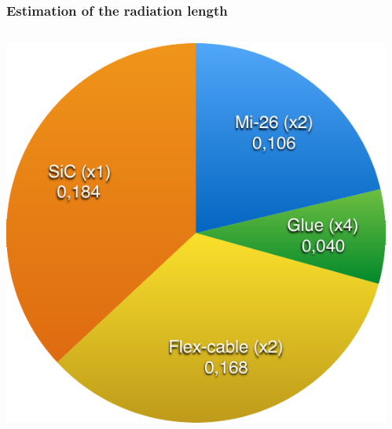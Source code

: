 \documentclass{beamer}
\begin{document}
  \begin{frame}
    \frametitle{Estimation of the radiation length}

    \begin{columns}[c]
      \begin{column}{5cm}
        \centering
        \includegraphics[width = \textwidth]{Pictures/X0.pdf}
        
      \end{column}
      \begin{column}{5cm}
        \centering


\end{column}
\end{columns}
\end{frame}
\end{document}

